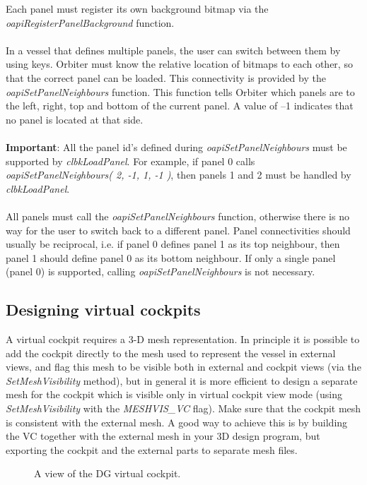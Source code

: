\documentclass[Orbiter Developer Manual.tex]{subfiles}
\begin{document}
\noindent
Each panel must register its own background bitmap via the \textit{oapiRegisterPanelBackground} function.\\
\\
In a vessel that defines multiple panels, the user can switch between them by using \Ctrl\DArrow\UArrow\RArrow\LArrow keys. Orbiter must know the relative location of bitmaps to each other, so that the correct panel can be loaded. This connectivity is provided by the \textit{oapiSetPanelNeighbours} function. This function tells Orbiter which panels are to the left, right, top and bottom of the current panel. A value of –1 indicates that no panel is located at that side.\\
\\
\textbf{Important}: All the panel id’s defined during \textit{oapiSetPanelNeighbours} must be supported by \textit{clbkLoadPanel}. For example, if panel 0 calls \textit{oapiSetPanelNeighbours( 2, -1, 1, -1 )}, then panels 1 and 2 must be handled by \textit{clbkLoadPanel}.\\
\\
All panels must call the \textit{oapiSetPanelNeighbours} function, otherwise there is no way for the user to switch back to a different panel. Panel connectivities should usually be reciprocal, i.e. if panel 0 defines panel 1 as its top neighbour, then panel 1 should define panel 0 as its bottom neighbour. If only a single panel (panel 0) is supported, calling \textit{oapiSetPanelNeighbours} is not necessary.


\subsection{Designing virtual cockpits}
A virtual cockpit requires a 3-D mesh representation. In principle it is possible to add the cockpit directly to the mesh used to represent the vessel in external views, and flag this mesh to be visible both in external and cockpit views (via the \textit{SetMeshVisibility} method), but in general it is more efficient to design a separate mesh for the cockpit which is visible only in virtual cockpit view mode (using \textit{SetMeshVisibility} with the \textit{MESHVIS\_VC} flag). Make sure that the cockpit mesh is consistent with the external mesh. A good way to achieve this is by building the VC together with the external mesh in your 3D design program, but exporting the cockpit and the external parts to separate mesh files.

\begin{figure}[H]
	\centering
	\caption{A view of the DG virtual cockpit.}
\end{figure}
\end{document}
